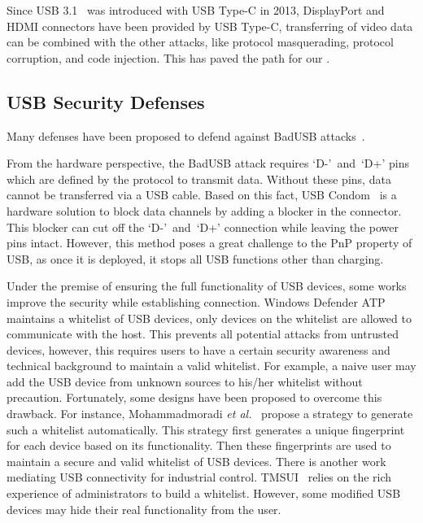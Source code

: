 Since \ac{USB} 3.1~\cite{usb31} was introduced with \ac{USB} Type-C in 2013, DisplayPort and HDMI
connectors have been provided by \ac{USB} Type-C, transferring of video data can be
combined with the other attacks, like protocol masquerading,  protocol
corruption, and code injection. This has paved the path for our \tool.

\subsection{USB Security Defenses}
\label{subsec:usb_defence}

Many defenses have been proposed to defend against BadUSB attacks~\cite{sok}.

From the hardware perspective, the BadUSB attack requires \mbox{`D-' and `D+'} pins which
are defined by the protocol to transmit data. Without these pins, data cannot 
be transferred via a \ac{USB} cable. Based
on this fact, \ac{USB} Condom~\cite{Condom} is a hardware solution to block data
channels by adding a blocker in the connector. This blocker can cut off the \mbox{`D-' and `D+'} connection while leaving the power pins intact. However, this method poses
a great challenge to the \ac{PnP} property of \ac{USB}, as once it is deployed, it
stops all \ac{USB} functions other than charging.

Under the premise of ensuring the full functionality of \ac{USB} devices, some works
improve the security while establishing connection. Windows Defender
ATP~\cite{windenfenderwhite} maintains a whitelist of \ac{USB} devices, only devices
on the whitelist are allowed to communicate with the host. This prevents all
potential attacks from untrusted devices, however, this requires users to have a
certain security awareness and technical background to maintain a valid
whitelist. For example, a naive user may add the \ac{USB} device from unknown
sources to his/her whitelist without precaution. Fortunately, some designs have been proposed to overcome
this drawback. For instance, Mohammadmoradi \emph{et al.}~\cite{mohammadmoradi2018making} propose a strategy to generate such a
whitelist automatically. This strategy first generates a unique fingerprint for
each device based on its functionality. Then these fingerprints are used to
maintain a secure and valid whitelist of \ac{USB} devices. There is another work
mediating \ac{USB} connectivity for industrial control. TMSUI~\cite{yang2015tmsui}
relies on the rich experience of administrators to build a whitelist. However, some
modified \ac{USB} devices may hide their real functionality from the user.

